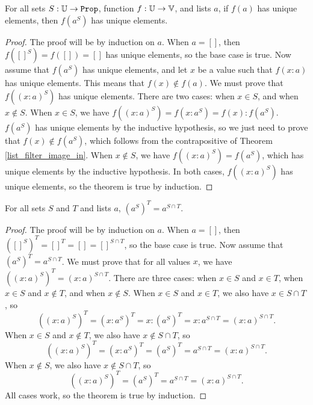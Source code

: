 \documentclass[../math.tex]{subfiles}
\begin{document}
\begin{theorem} \label{list_filter_image_unique}
    For all sets $S : \set{\U}$, function $f : \mathbb{U} \to \mathbb{V}$, and lists $a$, if
    $f(a)$ has unique elements, then $f(a^S)$ has unique elements.
\end{theorem}
\begin{proof}
    The proof will be by induction on $a$.  When $a = []$, then $f([]^S) = f([])
    = []$ has unique elements, so the base case is true.  Now assume that
    $f(a^S)$ has unique elements, and let $x$ be a value such that $f(x : a)$
    has unique elements.  This means that $f(x) \notin f(a)$.  We must prove
    that $f((x : a)^S)$ has unique elements.  There are two cases: when $x \in
    S$, and when $x \notin S$.  When $x \in S$, we have $f((x : a)^S) = f(x :
    a^S) = f(x) : f(a^S)$.  $f(a^S)$ has unique elements by the inductive
    hypothesis, so we just need to prove that $f(x) \notin f(a^S)$, which
    follows from the contrapositive of Theorem \ref{list_filter_image_in}.  When
    $x \notin S$, we have $f((x : a)^S) = f(a^S)$, which has unique elements by
    the inductive hypothesis.  In both cases, $f((x : a)^S)$ has unique
    elements, so the theorem is true by induction.
\end{proof}

\begin{theorem} \label{list_filter_inter}
    For all sets $S$ and $T$ and lists $a$, $(a^S)^T = a^{S \cap T}$.
\end{theorem}
\begin{proof}
    The proof will be by induction on $a$.  When $a = []$, then $([]^S)^T = []^T
    = [] = []^{S \cap T}$, so the base case is true.  Now assume that $(a^S)^T =
    a^{S \cap T}$.  We must prove that for all values $x$, we have $((x :
    a)^S)^T = (x : a)^{S \cap T}$.  There are three cases: when $x \in S$ and $x
    \in T$, when $x \in S$ and $x \notin T$, and when $x \notin S$.  When $x \in
    S$ and $x \in T$, we also have $x \in S \cap T$, so
    \[
        ((x : a)^S)^T = (x : a^S)^T = x : (a^S)^T = x : a^{S \cap T}
        = (x : a)^{S \cap T}.
    \]
    When $x \in S$ and $x \notin T$, we also have $x \notin S \cap T$, so
    \[
        ((x : a)^S)^T = (x : a^S)^T = (a^S)^T = a^{S \cap T}
        = (x : a)^{S \cap T}.
    \]
    When $x \notin S$, we also have $x \notin S \cap T$, so
    \[
        ((x : a)^S)^T = (a^S)^T = a^{S \cap T} = (x : a)^{S \cap T}.
    \]
    All cases work, so the theorem is true by induction.
\end{proof}
\end{document}
